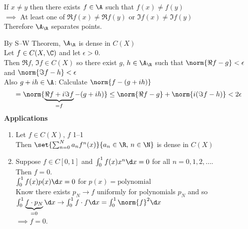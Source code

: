 If $x\neq y$ then there exists $f\in\A$ such that $f(x)\neq f(y)$ \\
$\implies$ At least one of $\Re f(x)\neq\Re f(y)$ or $\Im f(x)\neq\Im f(y)$ \\
Therefore $\A_\R$ separates points.

By S--W Theorem, $\A_\R$ is dense in $C(X)$ \\
Let $f\in C(X,\C)$ and let $\epsilon>0$. \\
Then $\Re f$, $\Im f\in C(X)$ so there exist $g$, $h\in\A_\R$ such that $\norm{\Re f-g}<\epsilon$ and $\norm{\Im f-h}<\epsilon$ \\
Also $g+ih\in\A$: Calculate $\norm{f-(g+ih)}$
\[ = \norm{\underbrace{\Re f+i\Im f}_{=f}-(g+ih)} \leq \norm{\Re f-g}+\norm{i(\Im f-h)} < 2\epsilon \]
%
\textbf{Applications}
\begin{enumerate}
\item Let $f\in C(X)$, $f$ 1--1 \\
Then $\set{\sum_{n=0}^N a_n f^n(x)}{a_n\in\R\text{, }n\in\N}$ is dense in $C(X)$
\item Suppose $f\in C[0,1]$ and $\int_0^1 f(x)x^n\d x=0$ for all $n=0,1,2,\dotsc$. \\
Then $f=0$. \\
\pf $\int_0^1 f(x)p(x)\d x=0$ for $p(x)=\text{polynomial}$ \\
Know there exists $p_N\to f$ uniformly for polynomials $p_N$ and so $\int_0^1 \underbrace{f\cdot p_N}_{=0}\d x \to \int_0^1 f\cdot f\d x = \int_0^1\norm{f}^2\d x$ \\
$\implies f=0$.
\end{enumerate}